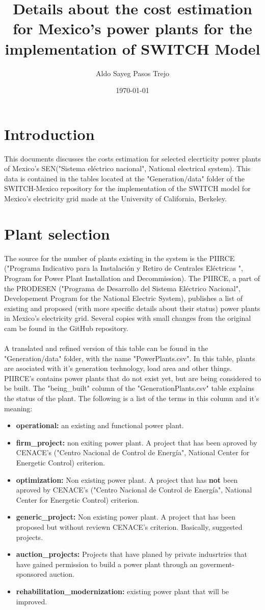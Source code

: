 \documentclass[letterpaper,12pt]{article}
\title{Details about the cost estimation for Mexico's power plants for the implementation of SWITCH Model}
\author[1,2]{Aldo Sayeg Pasos Trejo}
\affil[1]{\textit{Physics Departament. Facultad de Ciencias. Universidad Nacional Autonoma de Mexico}}
\affil[2]{\textit{Visiting Student Researcher for the Berkeley Energy and Climate Institute at University of California, Berkeley}}
\date{\today}
\begin{document}
\maketitle
\section{Introduction}
This documents discusses the costs estimation for selected elecrticity power plants of Mexico's SEN("Sistema eléctrico nacional", National electrical system). This data is contained in the tables located at the "Generation/data" folder of the SWITCH-Mexico repository\cite{repo} for the implementation of the SWITCH model for Mexico's electricity grid made at the University of California, Berkeley.
\section{Plant selection}
The source for the number of plants existing in the system is the PIIRCE ("Programa Indicativo para la Instalación y Retiro de Centrales Eléctricas ", Program for Power Plant Installation and Decommission). The PIIRCE, a part of the PRODESEN ("Programa de Desarrollo del Sistema Eléctrico Nacional", Developement Program for the National Electric System), publishes a list\cite{piirce} of existing and proposed (with more specific details about their status) power plants in Mexico's electricity grid. Several copies with small changes from the original cam be found in the GitHub repository.
\\
\\ A translated and refined version of this table can be found in the "Generation/data" folder, with the name "PowerPlants.csv". In this table, plants are asociated with it's generation technology, load area and other things. PIIRCE's contains power plants that do not exist yet, but are being considered to be built. The "being\_built" column of the "GenerationPlants.csv" table explains the status of the plant. The following is a list of the terms in this column and it's meaning:
\begin{itemize}
\item \textbf{operational: } an existing and functional power plant.
\item \textbf{firm\_project:} non exiting power plant. A project that has been aproved by CENACE's ("Centro Nacional de Control de Energía", National Center for Energetic Control) criterion.
\item \textbf{optimization:} Non existing power plant. A project that has \textbf{not} been aproved by CENACE's ("Centro Nacional de Control de Energía", National Center for Energetic Control) criterion.
\item \textbf{generic\_project:} Non existing power plant. A project that has been proposed but without reviewn CENACE's criterion. Basically, suggested projects.
\item \textbf{auction\_projects:} Projects that have planed by private indusrtries that have gained permission to build a power plant through an goverment-sponsored auction.
\item \textbf{rehabilitation\_modernization:} existing power plant that will be improved.
\end{itemize}
\end{document}
